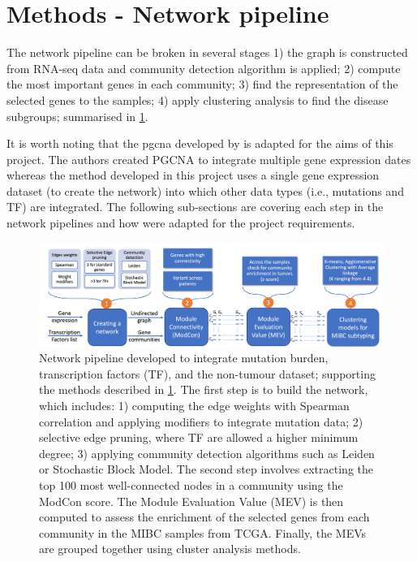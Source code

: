\section{Methods - Network pipeline} \label{s:N_I:methods}

The network pipeline can be broken in several stages 1) the graph is constructed from RNA-seq data and community detection algorithm is applied; 2) compute the most important genes in each community; 3) find the representation of the selected genes to the samples; 4) apply clustering analysis to find the disease subgroups; summarised in \cref{fig:N_I:network_pipeline}.

It is worth noting that the \acrfull{pgcna} developed by \citet{Care2019-ij} is adapted for the aims of this project. The authors created PGCNA to integrate multiple gene expression dates whereas the method developed in this project uses a single gene expression dataset (to create the network) into which other data types (i.e., mutations and TF) are integrated. The following sub-sections are covering each step in the network pipelines and how were adapted for the project requirements.

\begin{figure}
    \centering
    \includegraphics[width=1.0\textwidth,keepaspectratio]{Sections/Network_I/Resources/Methods/network_pipeline.png}
    \caption[The integrative network pipeline]{Network pipeline developed to integrate mutation burden, transcription factors (TF), and the non-tumour dataset; supporting the methods described in \cref{s:N_I:methods}. The first step is to build the network, which includes: 1) computing the edge weights with Spearman correlation and applying modifiers to integrate mutation data; 2) selective edge pruning, where TF are allowed a higher minimum degree; 3) applying community detection algorithms such as Leiden or Stochastic Block Model. The second step involves extracting the top 100 most well-connected nodes in a community using the ModCon score. The Module Evaluation Value (MEV) is then computed to assess the enrichment of the selected genes from each community in the MIBC samples from TCGA. Finally, the MEVs are grouped together using cluster analysis methods.}
    \hfill
    \label{fig:N_I:network_pipeline}
\end{figure}

